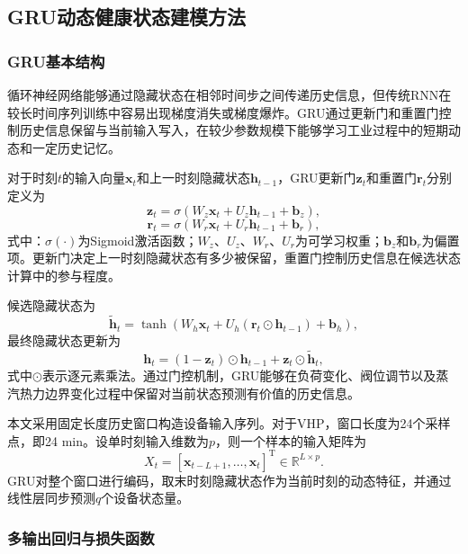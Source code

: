 \subsection{GRU动态健康状态建模方法}
\label{subsec:gru_method_v4}

\subsubsection{GRU基本结构}

循环神经网络能够通过隐藏状态在相邻时间步之间传递历史信息，但传统RNN在较长时间序列训练中容易出现梯度消失或梯度爆炸。GRU通过更新门和重置门控制历史信息保留与当前输入写入，在较少参数规模下能够学习工业过程中的短期动态和一定历史记忆\cite{Cho2014GRU}。

对于时刻$t$的输入向量$\mathbf x_t$和上一时刻隐藏状态$\mathbf h_{t-1}$，GRU更新门$\mathbf z_t$和重置门$\mathbf r_t$分别定义为
\begin{equation}
\mathbf z_t=\sigma(W_z\mathbf x_t+U_z\mathbf h_{t-1}+\mathbf b_z),
\end{equation}
\begin{equation}
\mathbf r_t=\sigma(W_r\mathbf x_t+U_r\mathbf h_{t-1}+\mathbf b_r),
\end{equation}
式中：$\sigma(\cdot)$为Sigmoid激活函数；$W_z$、$U_z$、$W_r$、$U_r$为可学习权重；$\mathbf b_z$和$\mathbf b_r$为偏置项。更新门决定上一时刻隐藏状态有多少被保留，重置门控制历史信息在候选状态计算中的参与程度。

候选隐藏状态为
\begin{equation}
\tilde{\mathbf h}_t=\tanh\left(W_h\mathbf x_t+U_h(\mathbf r_t\odot\mathbf h_{t-1})+\mathbf b_h\right),
\end{equation}
最终隐藏状态更新为
\begin{equation}
\mathbf h_t=(1-\mathbf z_t)\odot\mathbf h_{t-1}+\mathbf z_t\odot\tilde{\mathbf h}_t,
\end{equation}
式中$\odot$表示逐元素乘法。通过门控机制，GRU能够在负荷变化、阀位调节以及蒸汽热力边界变化过程中保留对当前状态预测有价值的历史信息。

本文采用固定长度历史窗口构造设备输入序列。对于VHP，窗口长度为24个采样点，即24 min。设单时刻输入维数为$p$，则一个样本的输入矩阵为
\begin{equation}
X_t=[\mathbf x_{t-L+1},\ldots,\mathbf x_t]^{\mathrm T}\in\mathbb R^{L\times p}.
\end{equation}
GRU对整个窗口进行编码，取末时刻隐藏状态作为当前时刻的动态特征，并通过线性层同步预测$q$个设备状态量。

\subsubsection{多输出回归与损失函数}

